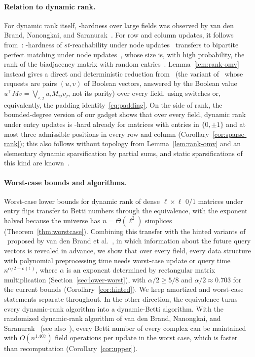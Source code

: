 \paragraph{Relation to dynamic rank.}
For dynamic rank itself, \OMv-hardness over large fields was observed by van den Brand, Nanongkai, and Saranurak~\cite{vdBNS19}.
For row and column updates, it follows from~\cite[Theorem~E.5]{vdBNS19full}: \OMv-hardness of $st$-reachability under node updates~\cite{HKNS15} transfers to bipartite perfect matching under node updates~\cite{AV14}, whose size is, with high probability, the rank of the biadjacency matrix with random entries~\cite[Theorem~C.24]{vdBNS19full}.
Lemma~\ref{lem:rank-omv} instead gives a direct and deterministic reduction from \OuMv\ (the variant of \OMv\ whose requests are pairs $(u,v)$ of Boolean vectors, answered by the Boolean value $u^{\top}Mv=\bigvee_{i,j}u_iM_{ij}v_j$, not its parity) over every field, using switches or, equivalently, the padding identity~\eqref{eq:padding}.
On the side of rank, the bounded-degree version of our gadget shows that over every field, dynamic rank under entry updates is \OMv-hard already for matrices with entries in $\{0,\pm1\}$ and at most three admissible positions in every row and column (Corollary~\ref{cor:sparse-rank}); this also follows without topology from Lemma~\ref{lem:rank-omv} and an elementary dynamic sparsification by partial sums, and static sparsifications of this kind are known~\cite{EP14,Yus08}.

\paragraph{Worst-case bounds and algorithms.}
Worst-case lower bounds for dynamic rank of dense $\ell\times\ell$ $0/1$ matrices under entry flips transfer to Betti numbers through the equivalence, with the exponent halved because the universe has $n=\Theta(\ell^2)$ simplices (Theorem~\ref{thm:worstcase}).
Combining this transfer with the hinted variants of \OMv\ proposed by van den Brand et al.~\cite{vdBNS19}, in which information about the future query vectors is revealed in advance, we show that over every field, every data structure with polynomial preprocessing time needs worst-case update or query time $n^{\alpha/2-o(1)}$, where $\alpha$ is an exponent determined by rectangular matrix multiplication (Section~\ref{sec:lower-worst}), with $\alpha/2\ge5/8$ and $\alpha/2\approx0.703$ for the current bounds (Corollary~\ref{cor:hinted}).
We keep amortized and worst-case statements separate throughout.
In the other direction, the equivalence turns every dynamic-rank algorithm into a dynamic-Betti algorithm.
With the randomized dynamic-rank algorithm of van den Brand, Nanongkai, and Saranurak~\cite{vdBNS19} (see also~\cite{San07}), every Betti number of every complex can be maintained with $O(n^{1.407})$ field operations per update in the worst case, which is faster than recomputation (Corollary~\ref{cor:upper}).

